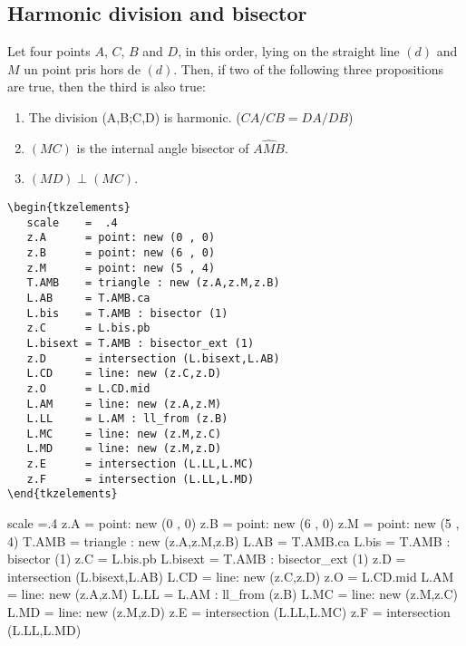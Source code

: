 \subsection{Harmonic division and bisector} %
\label{sub:harmonic_division_and_bisector}

Let four points $A$, $C$, $B$ and $D$, in this order, lying on the straight line $(d)$ and $M$ un point pris hors de $(d)$. Then, if two of the following three propositions are true, then the third is also true:
   \begin{enumerate}
   \item  The division (A,B;C,D) is harmonic. ($CA/CB = DA/DB$)
   \item  $(MC)$ is the internal angle bisector of $\widehat{AMB}$.
   \item  $(MD) \perp (MC)$.
   \end{enumerate}
  
  \vspace{6pt}
\begin{minipage}{.4\textwidth}
\begin{Verbatim}
\begin{tkzelements}
   scale    =  .4
   z.A      = point: new (0 , 0)
   z.B      = point: new (6 , 0)
   z.M      = point: new (5 , 4)
   T.AMB    = triangle : new (z.A,z.M,z.B)
   L.AB     = T.AMB.ca
   L.bis    = T.AMB : bisector (1)
   z.C      = L.bis.pb
   L.bisext = T.AMB : bisector_ext (1)
   z.D      = intersection (L.bisext,L.AB)
   L.CD     = line: new (z.C,z.D)
   z.O      = L.CD.mid
   L.AM     = line: new (z.A,z.M)
   L.LL     = L.AM : ll_from (z.B)
   L.MC     = line: new (z.M,z.C)
   L.MD     = line: new (z.M,z.D)
   z.E      = intersection (L.LL,L.MC)
   z.F      = intersection (L.LL,L.MD)
\end{tkzelements}
\end{Verbatim}
\end{minipage}
\begin{minipage}{.6\textwidth}
\begin{tkzelements}
   scale =.4
   z.A  = point: new (0 , 0)
   z.B  = point: new (6 , 0)
   z.M  = point: new (5 , 4)
   T.AMB    = triangle : new (z.A,z.M,z.B)
   L.AB = T.AMB.ca
   L.bis    = T.AMB : bisector (1)
   z.C  = L.bis.pb
   L.bisext = T.AMB : bisector_ext (1)
   z.D  = intersection (L.bisext,L.AB)
   L.CD = line: new (z.C,z.D)
   z.O  = L.CD.mid
   L.AM = line: new (z.A,z.M)
   L.LL = L.AM : ll_from (z.B)
   L.MC = line: new (z.M,z.C)
   L.MD = line: new (z.M,z.D)
   z.E  = intersection (L.LL,L.MC)
   z.F  = intersection (L.LL,L.MD)
\end{tkzelements}
\hspace{\fill}
\end{minipage}

